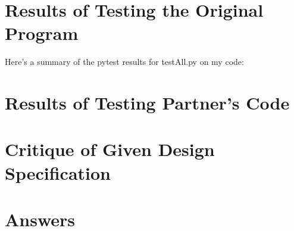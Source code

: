 \documentclass[12pt]{article}
\begin{document}
\section{Results of Testing the Original Program}
Here's a summary of the pytest results for testAll.py on my code:

\section{Results of Testing Partner's Code}

\section{Critique of Given Design Specification}

\section{Answers}
\end{document}
